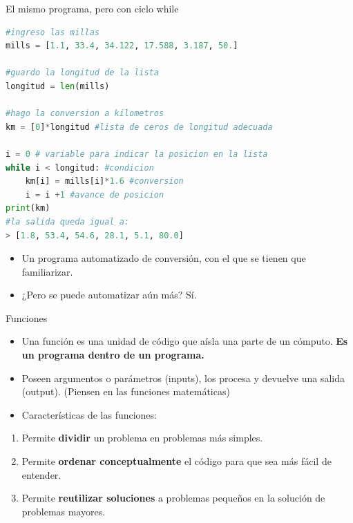 \documentclass{beamer}
\begin{document}
\begin{frame}[fragile]{El mismo programa, pero con ciclo while}
\begin{lstlisting}[language=Python]
#ingreso las millas 
mills = [1.1, 33.4, 34.122, 17.588, 3.187, 50.] 
    
#guardo la longitud de la lista
longitud = len(mills)
    
#hago la conversion a kilometros
km = [0]*longitud #lista de ceros de longitud adecuada
    
i = 0 # variable para indicar la posicion en la lista
while i < longitud: #condicion
    km[i] = mills[i]*1.6 #conversion
    i = i +1 #avance de posicion
print(km)
#la salida queda igual a: 
> [1.8, 53.4, 54.6, 28.1, 5.1, 80.0] 
\end{lstlisting} \pause

\begin{itemize}
        \item Un programa automatizado de conversión, con el que se tienen que familiarizar. \pause
        \item ¿Pero se puede automatizar aún más? \pause Sí.
\end{itemize}
\end{frame}


\begin{frame}{Funciones} \pause
\begin{itemize}
    \item Una función es una unidad de código que aísla una parte de un cómputo. \textbf{Es un programa dentro de un programa.} \pause
    \item Poseen argumentos o parámetros (inputs), los procesa y devuelve una salida (output). \pause (Piensen en las funciones matemáticas) \pause
    \item Características de las funciones: \pause
\end{itemize}
\begin{enumerate}
    \item Permite \textbf{dividir} un problema en problemas más simples. \pause
    \item Permite \textbf{ordenar conceptualmente} el código para que sea más fácil de entender. \pause
    \item Permite \textbf{reutilizar soluciones} a problemas pequeños en la solución de problemas mayores. 
\end{enumerate}
\end{frame}
\end{document}
